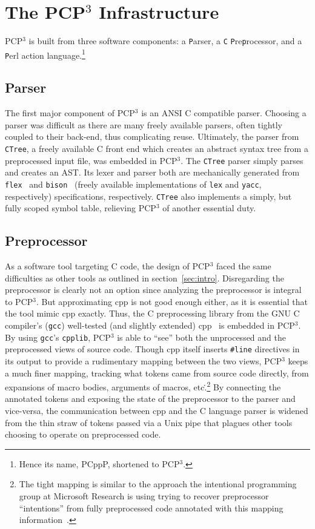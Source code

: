 \documentclass{article}
\newcommand{\pcp}{\mbox{\textsf{PCP}$^3$}}
\newcommand{\pcppp}{\mbox{\textsf{PCppP}}}
\newcommand{\Cpp}{\mbox{\textsf{cpp}}}
\newcommand{\C}{\mbox{\textsf{C}}}
\newcommand{\ppd}[1]{\texttt{\##1}}
\newcommand{\etc}{etc\.}
\begin{document}


\section{The \pcp{} Infrastructure}
\label{sec:pcp3}
\pcp{} is built from three software components: a \texttt{P}arser, a \texttt{C}
\texttt{P}re\texttt{p}rocessor, and a \texttt{P}erl action
language.\footnote{Hence its name, \pcppp{}, shortened to \pcp{}.}

\subsection{Parser}

The first major component of \pcp{} is an ANSI \C{} compatible parser.
Choosing a parser was difficult as there are many freely available
parsers, often tightly coupled to their back-end, thus complicating
reuse.  Ultimately, the parser from \texttt{CTree}, a freely available
\C{} front end which creates an abstract syntax tree from a preprocessed
input file, was embedded in \pcp{}.  The \texttt{CTree} parser simply
parses and creates an AST.  Its lexer and parser both are mechanically
generated from \texttt{flex}~\cite{Flex} and \texttt{bison}~\cite{Bison}
(freely available implementations of \texttt{lex} and \texttt{yacc},
respectively) specifications, respectively.  \texttt{CTree} also
implements a simply, but fully scoped symbol table, relieving \pcp{} of
another essential duty.

\subsection{Preprocessor}

As a software tool targeting \C{} code, the design of \pcp{} faced the
same difficulties as other tools as outlined in section~\ref{sec:intro}.
Disregarding the preprocessor is clearly not an option since analyzing
the preprocessor is integral to \pcp{}.  But approximating \Cpp{} is not
good enough either, as it is essential that the tool mimic \Cpp{}
exactly. Thus, the \C{} preprocessing library from the GNU \C{}
compiler's (\texttt{gcc}) well-tested (and slightly extended)
\Cpp{}~\cite{GCC} is embedded in \pcp{}.  By using \texttt{gcc}'s
\texttt{cpplib}, \pcp{} is able to ``see'' both the unprocessed and
the preprocessed views of source code.  Though \Cpp{} itself inserts
\ppd{line} directives in its output to provide a rudimentary mapping
between the two views, \pcp{} keeps a much finer mapping, tracking
what tokens came from source code directly, from expansions of macro
bodies, arguments of macros, \etc.\footnote{The tight mapping is similar
  to the approach the intentional programming group at Microsoft
  Research is using trying to recover preprocessor ``intentions'' from
  fully preprocessed code annotated with this mapping
  information~\cite{MSIPPersonal}.}  By connecting the annotated tokens
and exposing the state of the preprocessor to the parser and vice-versa,
the communication between \Cpp{} and the \C{} language parser is widened
from the thin straw of tokens passed via a Unix pipe that plagues other
tools choosing to operate on preprocessed code.
\end{document}
